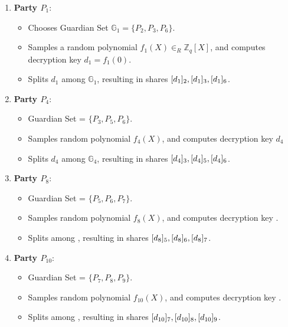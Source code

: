 \documentclass{article}
\begin{document}
\begin{enumerate}
    \item \textbf{Party $P_1$}:
    \begin{itemize}
        \item Chooses Guardian Set $\mathbb{G}_1 = \{P_2, P_3, P_6\}$.
        \item Samples a random polynomial $f_1(X) \in_R \mathbb{Z}_q[X]$, and computes decryption key $d_1 = f_1(0)$.
        \item Splits $d_1$ among $\mathbb{G}_1$, resulting in shares $[d_{1}]_{2}, [d_{1}]_{3}, [d_{1}]_{6}$.
    \end{itemize}

    \item \textbf{Party $P_4$}:
    \begin{itemize}
        \item Guardian Set  = $\{P_3, P_5, P_6\}$.
        \item Samples random polynomial $f_4(X)$, and computes decryption key $d_4$
        \item Splits $d_4$ among $\mathbb{G}_4$, resulting in shares $[d_{4}]_{3}, [d_{4}]_{5}, [d_{4}]_{6}$.
    \end{itemize}

    \item \textbf{Party $P_8$}:
    \begin{itemize}
        \item Guardian Set  = $\{P_5, P_6, P_7\}$.
        \item Samples random polynomial $f_8(X)$, and computes decryption key .
        \item Splits  among , resulting in shares $[d_{8}]_{5}, [d_{8}]_{6}, [d_{8}]_{7}$.
    \end{itemize}

    \item \textbf{Party $P_{10}$}:
    \begin{itemize}
        \item Guardian Set  = $\{P_7, P_8, P_9\}$.
        \item Samples random polynomial $f_{10}(X)$, and computes decryption key .
        \item Splits  among , resulting in shares $[d_{10}]_{7}, [d_{10}]_{8}, [d_{10}]_{9}$.
        
    \end{itemize}
\end{enumerate}
\end{document}

